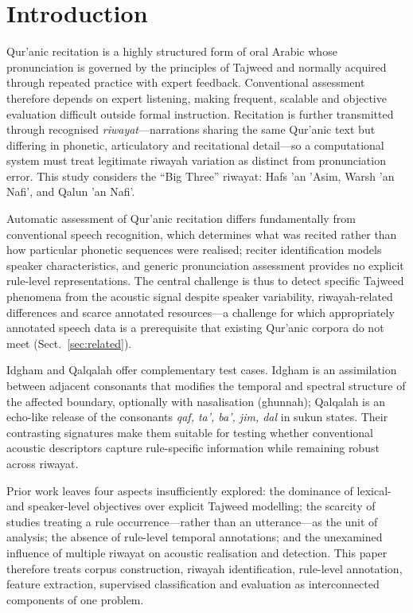 \documentclass[runningheads]{llncs}
\begin{document}
\section{Introduction}
\label{sec:intro}

Qur'anic recitation is a highly structured form of oral Arabic whose
pronunciation is governed by the principles of Tajweed and normally acquired
through repeated practice with expert feedback. Conventional assessment
therefore depends on expert listening, making frequent, scalable and objective
evaluation difficult outside formal instruction. Recitation is further
transmitted through recognised \emph{riwayat}---narrations sharing the same
Qur'anic text but differing in phonetic, articulatory and recitational
detail---so a computational system must treat legitimate riwayah variation as
distinct from pronunciation error. This study considers the ``Big Three''
riwayat: Hafs 'an 'Asim, Warsh 'an Nafi', and Qalun 'an Nafi'.

Automatic assessment of Qur'anic recitation differs fundamentally from
conventional speech recognition, which determines what was recited rather than
how particular phonetic sequences were realised; reciter identification models
speaker characteristics, and generic pronunciation assessment provides no
explicit rule-level representations. The central challenge is thus to detect
specific Tajweed phenomena from the acoustic signal despite speaker variability,
riwayah-related differences and scarce annotated resources---a challenge for
which appropriately annotated speech data is a prerequisite that existing
Qur'anic corpora do not meet (Sect.~\ref{sec:related}).

Idgham and Qalqalah offer complementary test cases. Idgham is an assimilation
between adjacent consonants that modifies the temporal and spectral structure
of the affected boundary, optionally with nasalisation (ghunnah); Qalqalah is an
echo-like release of the consonants \emph{qaf, ta', ba', jim, dal} in sukun
states. Their contrasting signatures make them suitable for testing whether
conventional acoustic descriptors capture rule-specific information while
remaining robust across riwayat.

Prior work leaves four aspects insufficiently explored: the dominance of
lexical- and speaker-level objectives over explicit Tajweed modelling; the
scarcity of studies treating a rule occurrence---rather than an utterance---as
the unit of analysis; the absence of rule-level temporal annotations; and the
unexamined influence of multiple riwayat on acoustic realisation and detection.
This paper therefore treats corpus construction, riwayah identification,
rule-level annotation, feature extraction, supervised classification and
evaluation as interconnected components of one problem.
\end{document}
